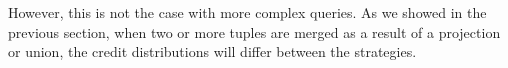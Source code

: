 However, this is not the case with more complex queries. As we showed in the previous section, when two or more tuples are merged as a result of a projection or union, the credit distributions will differ between the strategies. %

